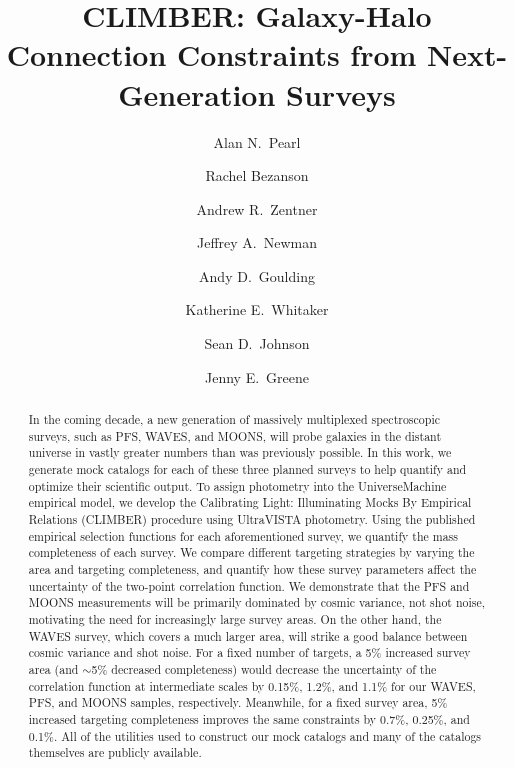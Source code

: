 \documentclass[twocolumn,twocolappendix]{aastex63}
\begin{document}
\title{CLIMBER: Galaxy-Halo Connection Constraints from Next-Generation Surveys}

\author[0000-0001-9820-9619]{Alan N.\ Pearl}
\author[0000-0001-5063-8254]{Rachel Bezanson}
\author[0000-0002-6443-7186]{Andrew R.\ Zentner}
\author[0000-0001-8684-2222]{Jeffrey A.\ Newman}
\author[0000-0003-4700-663X]{Andy D.\ Goulding}
\author[0000-0001-7160-3632]{Katherine E.\ Whitaker}
\author[0000-0001-9487-8583]{Sean D.\ Johnson}
\author[0000-0002-5612-3427]{Jenny E.\ Greene}

\begin{abstract}
    In the coming decade, a new generation of massively multiplexed spectroscopic surveys, such as PFS, WAVES, and MOONS, will probe galaxies in the distant universe in vastly greater numbers than was previously possible. In this work, we generate mock catalogs for each of these three planned surveys to help quantify and optimize their scientific output. To assign photometry into the UniverseMachine empirical model, we develop the Calibrating Light: Illuminating Mocks By Empirical Relations (CLIMBER) procedure using UltraVISTA photometry. Using the published empirical selection functions for each aforementioned survey, we quantify the mass completeness of each survey. We compare different targeting strategies by varying the area and {targeting} completeness, and quantify how these survey parameters affect the uncertainty of the two-point correlation function. We demonstrate that the PFS and MOONS measurements will be primarily dominated by cosmic variance, not shot noise, motivating the need for increasingly large survey areas. On the other hand, the WAVES survey, which covers a much larger area, will strike a good balance between cosmic variance and shot noise. {For a fixed number of targets, a 5\% increased survey area (and $\sim$5\% decreased completeness) would decrease the uncertainty of the correlation function at intermediate scales by 0.15\%, 1.2\%, and 1.1\% for our WAVES, PFS, and MOONS samples, respectively. Meanwhile, for a fixed survey area, 5\% increased targeting completeness improves the same constraints by 0.7\%, 0.25\%, and 0.1\%.} All of the utilities used to construct our mock catalogs and many of the catalogs themselves are publicly available.
\end{abstract}
\end{document}
